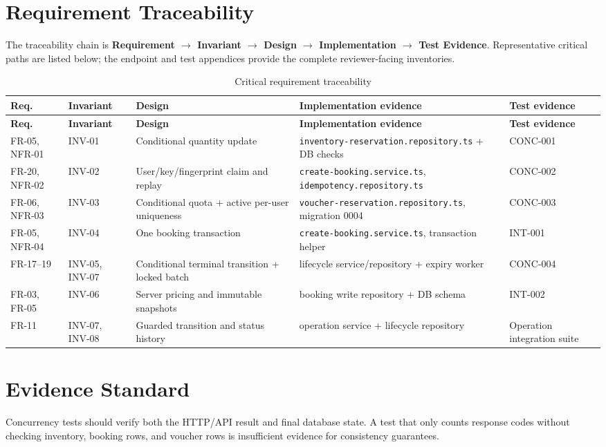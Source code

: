 \section{Requirement Traceability}
The traceability chain is \textbf{Requirement $\rightarrow$ Invariant
$\rightarrow$ Design $\rightarrow$ Implementation $\rightarrow$ Test
Evidence}. Representative critical paths are listed below; the endpoint and
test appendices provide the complete reviewer-facing inventories.

\begingroup
\setlength{\tabcolsep}{3pt}
\scriptsize
\begin{longtable}{p{}p{}p{}p{}p{}}
\caption{Critical requirement traceability}\label{tab:requirement-traceability}\\
\toprule
\textbf{Req.} & \textbf{Invariant} & \textbf{Design} & \textbf{Implementation evidence} & \textbf{Test evidence} \\
\midrule
\endfirsthead
\toprule
\textbf{Req.} & \textbf{Invariant} & \textbf{Design} & \textbf{Implementation evidence} & \textbf{Test evidence} \\
\midrule
\endhead
FR-05, NFR-01 & INV-01 & Conditional quantity update & \nolinkurl{inventory-reservation.repository.ts} + DB checks & CONC-001 \\
FR-20, NFR-02 & INV-02 & User/key/fingerprint claim and replay & \nolinkurl{create-booking.service.ts}, \nolinkurl{idempotency.repository.ts} & CONC-002 \\
FR-06, NFR-03 & INV-03 & Conditional quota + active per-user uniqueness & \nolinkurl{voucher-reservation.repository.ts}, migration 0004 & CONC-003 \\
FR-05, NFR-04 & INV-04 & One booking transaction & \nolinkurl{create-booking.service.ts}, transaction helper & INT-001 \\
FR-17--19 & INV-05, INV-07 & Conditional terminal transition + locked batch & lifecycle service/repository + expiry worker & CONC-004 \\
FR-03, FR-05 & INV-06 & Server pricing and immutable snapshots & booking write repository + DB schema & INT-002 \\
FR-11 & INV-07, INV-08 & Guarded transition and status history & operation service + lifecycle repository & Operation integration suite \\
\bottomrule
\end{longtable}
\endgroup

\section{Evidence Standard}
Concurrency tests should verify both the HTTP/API result and final database state. A test that only counts response codes without checking inventory, booking rows, and voucher rows is insufficient evidence for consistency guarantees.
